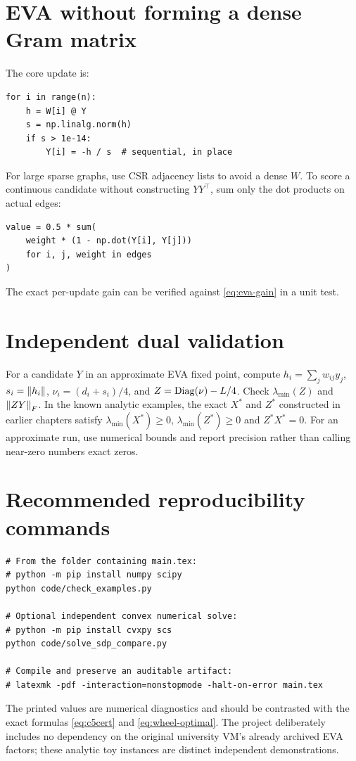 \section{EVA without forming a dense Gram matrix}
The core update is:
\begin{lstlisting}[style=py]
for i in range(n):
    h = W[i] @ Y
    s = np.linalg.norm(h)
    if s > 1e-14:
        Y[i] = -h / s  # sequential, in place
\end{lstlisting}
For large sparse graphs, use CSR adjacency lists to avoid a dense $W$. To score a continuous candidate without constructing $YY^\top$, sum only the dot products on actual edges:
\begin{lstlisting}[style=py]
value = 0.5 * sum(
    weight * (1 - np.dot(Y[i], Y[j]))
    for i, j, weight in edges
)
\end{lstlisting}
The exact per-update gain can be verified against \eqref{eq:eva-gain} in a unit test.

\section{Independent dual validation}
For a candidate $Y$ in an approximate EVA fixed point, compute $h_i=\sum_jw_{ij}y_j$, $s_i=\left\lVert h_i\right\rVert$, $\nu_i=(d_i+s_i)/4$, and $Z=\operatorname{Diag}(\nu)-L/4$. Check $\lambda_{\min}(Z)$ and $\left\lVert ZY\right\rVert_F$. In the known analytic examples, the exact $X^*$ and $Z^*$ constructed in earlier chapters satisfy $\lambda_{\min}(X^*)\ge0$, $\lambda_{\min}(Z^*)\ge0$ and $Z^*X^*=0$. For an approximate run, use numerical bounds and report precision rather than calling near-zero numbers exact zeros.

\section{Recommended reproducibility commands}
\begin{lstlisting}[style=py]
# From the folder containing main.tex:
# python -m pip install numpy scipy
python code/check_examples.py

# Optional independent convex numerical solve:
# python -m pip install cvxpy scs
python code/solve_sdp_compare.py

# Compile and preserve an auditable artifact:
# latexmk -pdf -interaction=nonstopmode -halt-on-error main.tex
\end{lstlisting}
The printed values are numerical diagnostics and should be contrasted with the exact formulas \eqref{eq:c5cert} and \eqref{eq:wheel-optimal}. The project deliberately includes no dependency on the original university VM's already archived EVA factors; these analytic toy instances are distinct independent demonstrations.
